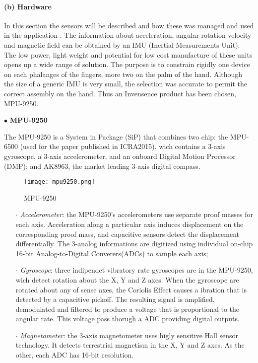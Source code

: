 \paragraph{(b) Hardware}

In this section the sensors will be described and how these was managed and used in the application . The information about acceleration, angular rotation velocity and  magnetic field can be obtained by an IMU (Inertial Measurements Unit).  The low power, light weight and potential for low cost manufacture of these units opens up a wide range of solution. The  purpose is to constrain rigidly one device on each phalanges of the fingers, more two  on the palm of the hand.  Although the size of a generic IMU is very small, the selection  was accurate to permit the correct assembly on the hand. Thus an Invensence product has been chosen, MPU-9250.  \\
\newline

\noindent $\bullet$ \textbf{MPU-9250}

\noindent The MPU-9250 is a System in Package (SiP) that combines two chip: the MPU-6500 (used for the paper published in ICRA2015), wich contains a 3-axis gyroscope, a 3-axis accelerometer, and an onboard Digital Motion Processor (DMP); and AK8963, the market leading 3-axis digital compass.  
\begin{figure}[h]
\centering
\texttt{[image: mpu9250.png]}
\caption{MPU-9250}
\label{fig:mpu9250}
\end{figure}

\begin{itemize}
\item[$\cdot$] \textit{Accelerometer}: the MPU-9250's accelerometers use separate proof masses for each axis. Acceleration along a particular axis induces displacement on the corresponding proof mass, and capacitive sensors detect the displacement differentially. The 3-analog informations are digitized using individual on-chip 16-bit Analog-to-Digital Converers(ADCs) to sample each axis;

 \item[$\cdot$] \textit{Gyroscope}: three indipendet vibratory rate gyroscopes are in the MPU-9250, wich detect rotation about the X, Y and Z axes. When the gyroscope are rotated about any of sense axes, the Coriolis Effect causes a ibration that is detected by a capacitive pickoff. The resulting signal is amplified, demodulated and filtered to produce a voltage that is proportional to the angular rate. This voltage pass thorugh a ADC providing digital outputs.

 \item[$\cdot$] \textit{Magnetometer}: the 3-axis magnetometer uses higly sensitive Hall sensor technology. It detects terrestrial magnetism in the X, Y and Z axes. As the other, each ADC has 16-bit resolution. 
\end{itemize}


